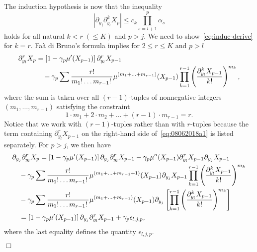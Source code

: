 \documentclass[aap,preprint]{imsart}
\newcommand{\proofendsign}{$\Box$}
\newenvironment{proof}{{\noindent \bf Proof }}
 {{\hspace*{\fill}\proofendsign\par\bigskip}}
\begin{document}
\begin{proof}
The induction hypothesis is now that the inequality
\begin{equation}\label{eq:induc-derive}
\left|\partial_{y_{j}}\partial_{y_{l}}^{k}X_{p}\right|
\leq c_{k}\prod_{s=l+1}^{p}\alpha_{s}
\end{equation}
holds for all natural $k<r\;(\le K)$ and $p>j$.
We need to show~\eqref{eq:induc-derive} for $k=r$.
Fa\`a di Bruno's formula implies for $2\le r\le K$ and $p>l$
\begin{align}
\partial_{y_{l}}^{r}X_{p}
&=\left[1-\gamma_{p}\mu'(X_{p-1})\right]\partial_{y_{l}}^{r}X_{p-1}
\label{eq:08062018a1}\\
&\hspace{1em}-\gamma_{p}\sum\frac{r!}{m_{1}!\ldots m_{r-1}!\,}\mu^{(m_{1}+\ldots+m_{r-1})}(X_{p-1})\prod_{k=1}^{r-1}\left(\frac{\partial_{y_{l}}^{k}X_{p-1}}{k!}\right)^{m_{k}},
\notag
\end{align}
where the sum is taken over all $(r-1)$-tuples of nonnegative integers
$(m_{1},\ldots,m_{r-1})$ satisfying the constraint
\begin{equation}\label{eq:09062018a1}
1\cdot m_{1}+2\cdot m_{2}+\ldots+(r-1)\cdot m_{r-1}=r.
\end{equation}
Notice that we work with $(r-1)$-tuples
rather than with $r$-tuples
because the term containing
$\partial_{y_l}^r X_{p-1}$
on the right-hand side of~\eqref{eq:08062018a1}
is listed separately.
For $p>j$, we then have
\begin{align}
&\partial_{y_{j}}\partial_{y_{l}}^{r}X_{p}
=\left[1-\gamma_{p}\mu'(X_{p-1})\right]\partial_{y_{j}}\partial_{y_{l}}^{r}X_{p-1}-\gamma_{p}\mu''(X_{p-1})\partial_{y_{l}}^{r}X_{p-1}\partial_{y_{j}}X_{p-1}
\label{eq:09062018a2}\\
&\hspace{1em}-\gamma_{p}\sum\frac{r!}{m_{1}!\ldots m_{r-1}!\,}\mu^{(m_{1}+\ldots+m_{r-1}+1)}(X_{p-1})\partial_{y_{j}}X_{p-1}\prod_{k=1}^{r-1}\left(\frac{\partial_{y_{l}}^{k}X_{p-1}}{k!}\right)^{m_{k}}
\notag\\
&\hspace{1em}-\gamma_{p}\sum\frac{r!}{m_{1}!\ldots m_{r-1}!\,}\mu^{(m_{1}+\ldots+m_{r-1})}(X_{p-1})\partial_{y_{j}}\left[\prod_{k=1}^{r-1}\left(\frac{\partial_{y_{l}}^{k}X_{p-1}}{k!}\right)^{m_{k}}\right]
\notag\\
&\hspace{1em} =\left[1-\gamma_{p}\mu'(X_{p-1})\right]\partial_{y_{j}}\partial_{y_{l}}^{r}X_{p-1}+\gamma_{p}\epsilon_{l,j,p},
\notag
\end{align}
where the last equality defines the quantity $\epsilon_{l,j,p}$.

\end{proof}
\end{document}
